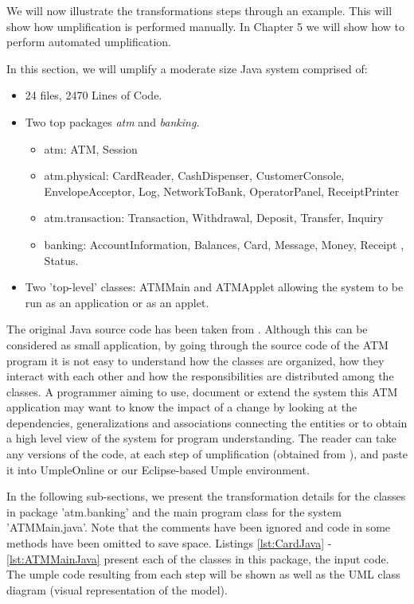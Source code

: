We will now illustrate the transformations steps through an example. This will show how umplification is performed manually. In Chapter 5 we will show how to perform automated umplification.

In this section, we will umplify a moderate size Java system  comprised of:

\begin{itemize}
 \item 24 files, 2470 Lines of Code.
 \item Two top packages \textit{atm} and \textit{banking}.
	\begin{itemize}
	 \item atm: ATM, Session
	 \item atm.physical: CardReader, CashDispenser, CustomerConsole, EnvelopeAcceptor, Log, NetworkToBank, OperatorPanel, ReceiptPrinter
	 \item atm.transaction: Transaction, Withdrawal, Deposit, Transfer, Inquiry
	 \item banking: AccountInformation, Balances, Card, Message, Money, Receipt , Status.
	\end{itemize}
 \item Two 'top-level' classes: ATMMain and ATMApplet allowing the system to be run as an application or as an applet.
\end{itemize}

The original Java source code has been taken from \cite{atmsystem}. Although this can be considered as small application, by going through the source code of the ATM program it is not easy to understand how the classes are organized, how they interact with each other and how the responsibilities are distributed among the classes. A programmer aiming to use, document or extend the system this ATM application may want to know the impact of a change by looking at the dependencies, generalizations and associations connecting the entities or to obtain a high level view of the system for program understanding. The reader can take any versions of the code, at each step of umplification (obtained from \cite{UmplificationBasicExampleURL}), and paste it into UmpleOnline \cite{UmpleOnline} or our Eclipse-based Umple environment. 

In the following sub-sections, we present the transformation details for the classes in package 'atm.banking' and the main program class for the system 'ATMMain.java'. Note that the comments have been ignored and code in some methods have been omitted to save space.  Listings \ref{lst:CardJava} - \ref{lst:ATMMainJava} present each of the classes in this package, the input code. The umple code resulting from each step will be shown as well as the UML class diagram (visual representation of the model). 

